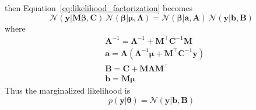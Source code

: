\documentclass[12pt,dvipsnames]{report}
\renewcommand{\vec}[1]{\boldsymbol{\mathbf{#1}}}
\begin{document}
then Equation~\ref{eq:likelihood_factorization} becomes
\citep[for the proof see][]{arXiv:2005.14199}
\begin{equation}
    \mathcal{N}(\vec{y} \lvert \vec{M} \vec\beta, \vec{C})\, \mathcal{N}(\vec\beta \lvert\vec{\mu}, \vec{\Lambda})=\mathcal{N}(\vec\beta \lvert\vec{a}, \vec{A})\, \mathcal{N}(\vec{y} \lvert\vec{b}, \vec{B})
\end{equation}
where
\begin{align}
     & \vec{A}^{-1}   =\vec{\Lambda}^{-1}+\vec{M}^{\intercal} \vec{C}^{-1} \vec{M}                                                     \\
     & \vec{a}     =\vec{A} \left(\boldsymbol{\Lambda}^{-1} \boldsymbol{\mu}+\vec{M}^{\intercal} \mathbf{C}^{-1} \boldsymbol{y}\right) \\
     & \mathbf{B}=\mathbf{C}+\vec{M} \vec{\Lambda} \vec{M}^{\intercal}                                                                 \\
     & \vec{b}=\vec{M} \vec{\mu}
\end{align}
Thus the marginalized likelihood is
\begin{equation}
    p(\vec{y}\lvert \vec{\theta}) = \mathcal{N}(\vec{y} \lvert \vec{b}, \vec{B})
    \label{eq:likelihood_lin_params_marginalized}
\end{equation}
\end{document}
